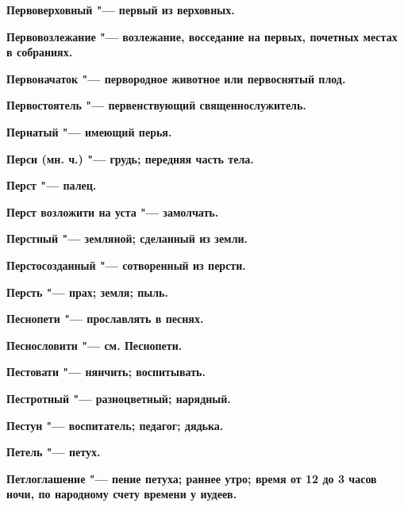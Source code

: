 \begin{mymulticols}{2}
\bfseries Первоверховный\normalfont{} "--- первый из верховных. 




\bfseries Первовозлежание\normalfont{} "--- возлежание, восседание на первых, почетных местах в собраниях. 




\bfseries Первоначаток\normalfont{} "--- первородное животное или первоснятый плод. 




\bfseries Первостоятель\normalfont{} "--- первенствующий священнослужитель. 




\bfseries Пернатый\normalfont{} "--- имеющий перья. 




\bfseries Перси\normalfont{} (мн. ч.) "--- грудь; передняя часть тела. 




\bfseries Перст\normalfont{} "--- палец. 




\bfseries Перст возложити на уста\normalfont{} "--- замолчать. 




\bfseries Перстный\normalfont{} "--- земляной; сделанный из земли. 




\bfseries Перстосозданный\normalfont{} "--- сотворенный из персти. 




\bfseries Персть\normalfont{} "--- прах; земля; пыль. 




\bfseries Песнопети\normalfont{} "--- прославлять в песнях. 




\bfseries Песнословити\normalfont{} "--- см. Песнопети. 




\bfseries Пестовати\normalfont{} "--- нянчить; воспитывать. 




\bfseries Пестротный\normalfont{} "--- разноцветный; нарядный. 




\bfseries Пестун\normalfont{} "--- воспитатель; педагог; дядька. 




\bfseries Петель\normalfont{} "--- петух. 




\bfseries Петлоглашение\normalfont{} "--- пение петуха; раннее утро; время от 12 до 3 часов ночи, по народному счету времени у иудеев. 





\end{mymulticols}
